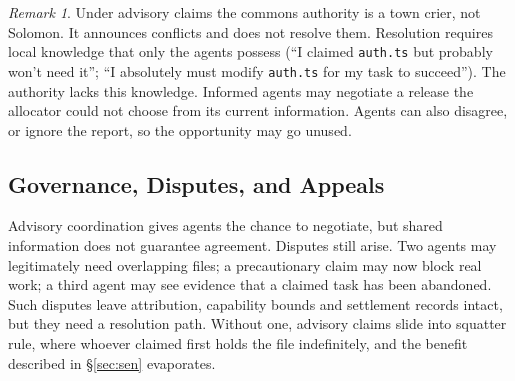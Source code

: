 \documentclass[11pt,a4paper]{article}
\theoremstyle{definition}
\theoremstyle{remark}
\newtheorem*{remark}{Remark}
\begin{document}
\begin{remark}
Under advisory claims the commons authority is a town crier, not Solomon. It announces conflicts and does not resolve them. Resolution requires local knowledge that only the agents possess (``I claimed \texttt{auth.ts} but probably won't need it''; ``I absolutely must modify \texttt{auth.ts} for my task to succeed''). The authority lacks this knowledge. Informed agents may negotiate a release the allocator could not choose from
its current information. Agents can also disagree, or ignore the report,
so the opportunity may go unused.
\end{remark}

\subsection{Governance, Disputes, and Appeals}\label{sec:governance}

Advisory coordination gives agents the chance to negotiate, but shared
information does not guarantee agreement. Disputes still arise. Two agents may legitimately need overlapping files; a precautionary claim may now block real work; a third agent may see evidence that a claimed task has been abandoned. Such disputes leave attribution, capability bounds and settlement records intact, but they need a resolution path. Without one, advisory claims slide into squatter rule, where whoever claimed first holds the file indefinitely, and the benefit described in \S\ref{sec:sen} evaporates.
\end{document}
